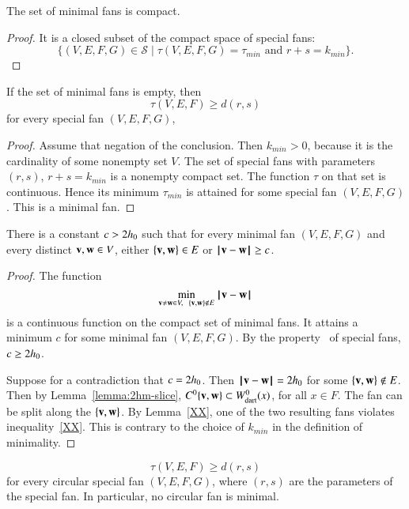 \begin{lemma}\guid{}
The set of minimal fans is compact.
\end{lemma}

\begin{proof}  It is a closed subset of the compact space of special fans:
$$
\{(V,E,F,G)\in {\mathcal S} \mid \tau(V,E,F,G)=\tau_{min} \text{ and }
   r+s = k_{min}\}.
$$ 
\end{proof}

\begin{lemma}\guid{}
If the set of minimal fans is empty, then
$$
\tau(V,E,F) \ge d (r,s)
$$
for every special fan $(V,E,F,G)$,
\end{lemma}

\begin{proof} Assume that negation of the conclusion.  
Then $k_{min}>0$, because it is the cardinality of some nonempty set $V$.
The set of special fans with parameters $(r,s)$, $r+s=k_{min}$ is a nonempty 
compact
set.  The function $\tau$ on that set is continuous.  Hence its minimum
$\tau_{min}$ is attained for some special fan $(V,E,F,G)$.  This is a minimal fan.
\end{proof}

\begin{lemma}\guid{}
There is a constant $c>2{h_0}$ such that for every minimal fan $(V,E,F,G)$
and every distinct ${\mathbf v},{\mathbf w}\in V$, either $\{{\mathbf v},{\mathbf w}\}\in E$ or ${\hskip0.1em|\hskip-0.15em|\hskip0.1em}{\mathbf v} - {\mathbf w}{\hskip0.1em|\hskip-0.15em|\hskip0.1em}\ge c$.
\end{lemma}

\begin{proof} The function
$$
\min_{{\mathbf v}\ne {\mathbf w}\in V,~~\{{\mathbf v},{\mathbf w}\}\not\in E} {\hskip0.1em|\hskip-0.15em|\hskip0.1em}{\mathbf v} - {\mathbf w}{\hskip0.1em|\hskip-0.15em|\hskip0.1em}
$$
is a continuous function on the compact set of minimal fans.
It attains a minimum $c$ for some minimal fan $(V,E,F,G)$.  By the property~ of special fans, $c\ge 2{h_0}$.

Suppose for a contradiction that $c=2{h_0}$.  Then ${\hskip0.1em|\hskip-0.15em|\hskip0.1em}{\mathbf v} - {\mathbf w}{\hskip0.1em|\hskip-0.15em|\hskip0.1em}=2{h_0}$ for
some $\{{\mathbf v},{\mathbf w}\}\not\in E$.  Then by Lemma~\ref{lemma:2hm-slice}, $C^0\{{\mathbf v},{\mathbf w}\}\subset W^0_{\text{dart}}(x)$, for all $x\in F$.
The fan can be split along the $\{{\mathbf v},{\mathbf w}\}$.  By Lemma~\ref{XX}, one of the two resulting fans violates inequality~\ref{XX}.  This is contrary to the choice of $k_{min}$ in the definition of minimality.
\end{proof}

\begin{lemma}
$$
\tau(V,E,F) \ge d (r,s)
$$
for every circular special fan $(V,E,F,G)$,
where $(r,s)$ are the parameters of the special fan.  In particular, no
circular fan is minimal.
\end{lemma}


